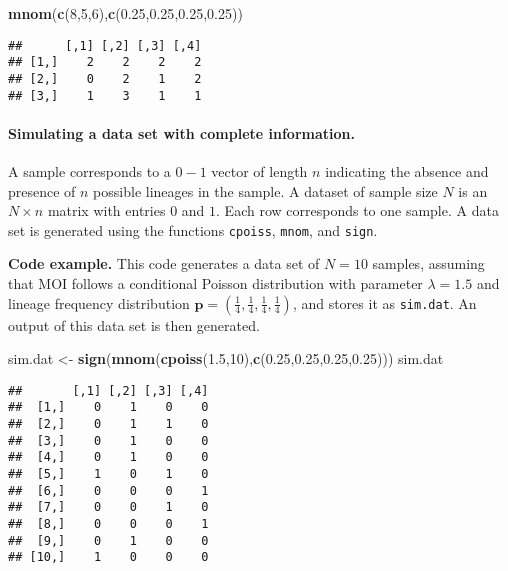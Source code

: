 \documentclass[
]{article}
\newenvironment{Shaded}{\begin{snugshade}}{\end{snugshade}}
\newcommand{\DecValTok}[1]{\textcolor[rgb]{0.00,0.00,0.81}{#1}}
\newcommand{\FloatTok}[1]{\textcolor[rgb]{0.00,0.00,0.81}{#1}}
\newcommand{\FunctionTok}[1]{\textcolor[rgb]{0.13,0.29,0.53}{\textbf{#1}}}
\newcommand{\NormalTok}[1]{#1}
\newcommand{\OtherTok}[1]{\textcolor[rgb]{0.56,0.35,0.01}{#1}}
\begin{document}
\begin{Shaded}
\begin{Highlighting}[]
\FunctionTok{mnom}\NormalTok{(}\FunctionTok{c}\NormalTok{(}\DecValTok{8}\NormalTok{,}\DecValTok{5}\NormalTok{,}\DecValTok{6}\NormalTok{),}\FunctionTok{c}\NormalTok{(}\FloatTok{0.25}\NormalTok{,}\FloatTok{0.25}\NormalTok{,}\FloatTok{0.25}\NormalTok{,}\FloatTok{0.25}\NormalTok{))}
\end{Highlighting}
\end{Shaded}

\begin{verbatim}
##      [,1] [,2] [,3] [,4]
## [1,]    2    2    2    2
## [2,]    0    2    1    2
## [3,]    1    3    1    1
\end{verbatim}

\hypertarget{simulating-a-data-set-with-complete-information.}{%
\paragraph{Simulating a data set with complete
information.}\label{simulating-a-data-set-with-complete-information.}}

A sample corresponds to a \(0-1\) vector of length \(n\) indicating the
absence and presence of \(n\) possible lineages in the sample. A dataset
of sample size \(N\) is an \(N\times n\) matrix with entries \(0\) and
\(1\). Each row corresponds to one sample. A data set is generated using
the functions \texttt{cpoiss}, \texttt{mnom}, and \texttt{sign}.

\textbf{Code example.} This code generates a data set of \(N=10\)
samples, assuming that MOI follows a conditional Poisson distribution
with parameter \(\lambda=1.5\) and lineage frequency distribution
\(\pmb p=(\frac 14,\frac 14,\frac 14,\frac 14)\), and stores it as
\texttt{sim.dat}. An output of this data set is then generated.

\begin{Shaded}
\begin{Highlighting}[]
\NormalTok{sim.dat }\OtherTok{\textless{}{-}} \FunctionTok{sign}\NormalTok{(}\FunctionTok{mnom}\NormalTok{(}\FunctionTok{cpoiss}\NormalTok{(}\FloatTok{1.5}\NormalTok{,}\DecValTok{10}\NormalTok{),}\FunctionTok{c}\NormalTok{(}\FloatTok{0.25}\NormalTok{,}\FloatTok{0.25}\NormalTok{,}\FloatTok{0.25}\NormalTok{,}\FloatTok{0.25}\NormalTok{)))}
\NormalTok{sim.dat}
\end{Highlighting}
\end{Shaded}

\begin{verbatim}
##       [,1] [,2] [,3] [,4]
##  [1,]    0    1    0    0
##  [2,]    0    1    1    0
##  [3,]    0    1    0    0
##  [4,]    0    1    0    0
##  [5,]    1    0    1    0
##  [6,]    0    0    0    1
##  [7,]    0    0    1    0
##  [8,]    0    0    0    1
##  [9,]    0    1    0    0
## [10,]    1    0    0    0
\end{verbatim}
\end{document}
